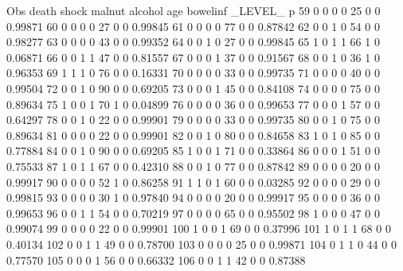 \documentclass{article}
\begin{document}
\begin{Woutput}
Obs  death  shock  malnut  alcohol  age  bowelinf  _LEVEL_     p
 59    0      0       0       0      25      0        0     0.99871
 60    0      0       0       0      27      0        0     0.99845
 61    0      0       0       0      77      0        0     0.87842
 62    0      0       1       0      54      0        0     0.98277
 63    0      0       0       0      43      0        0     0.99352
 64    0      0       1       0      27      0        0     0.99845
 65    1      0       1       1      66      1        0     0.06871
 66    0      0       1       1      47      0        0     0.81557
 67    0      0       0       1      37      0        0     0.91567
 68    0      0       1       0      36      1        0     0.96353
 69    1      1       1       0      76      0        0     0.16331
 70    0      0       0       0      33      0        0     0.99735
 71    0      0       0       0      40      0        0     0.99504
 72    0      0       1       0      90      0        0     0.69205
 73    0      0       0       1      45      0        0     0.84108
 74    0      0       0       0      75      0        0     0.89634
 75    1      0       0       1      70      1        0     0.04899
 76    0      0       0       0      36      0        0     0.99653
 77    0      0       0       1      57      0        0     0.64297
 78    0      0       1       0      22      0        0     0.99901
 79    0      0       0       0      33      0        0     0.99735
 80    0      0       1       0      75      0        0     0.89634
 81    0      0       0       0      22      0        0     0.99901
 82    0      0       1       0      80      0        0     0.84658
 83    1      0       1       0      85      0        0     0.77884
 84    0      0       1       0      90      0        0     0.69205
 85    1      0       0       1      71      0        0     0.33864
 86    0      0       0       1      51      0        0     0.75533
 87    1      0       1       1      67      0        0     0.42310
 88    0      0       1       0      77      0        0     0.87842
 89    0      0       0       0      20      0        0     0.99917
 90    0      0       0       0      52      1        0     0.86258
 91    1      1       0       1      60      0        0     0.03285
 92    0      0       0       0      29      0        0     0.99815
 93    0      0       0       0      30      1        0     0.97840
 94    0      0       0       0      20      0        0     0.99917
 95    0      0       0       0      36      0        0     0.99653
 96    0      0       1       1      54      0        0     0.70219
 97    0      0       0       0      65      0        0     0.95502
 98    1      0       0       0      47      0        0     0.99074
 99    0      0       0       0      22      0        0     0.99901
100    1      0       0       1      69      0        0     0.37996
101    1      0       1       1      68      0        0     0.40134
102    0      0       1       1      49      0        0     0.78700
103    0      0       0       0      25      0        0     0.99871
104    0      1       1       0      44      0        0     0.77570
105    0      0       0       1      56      0        0     0.66332
106    0      0       1       1      42      0        0     0.87388
\end{Woutput}
\end{document}
